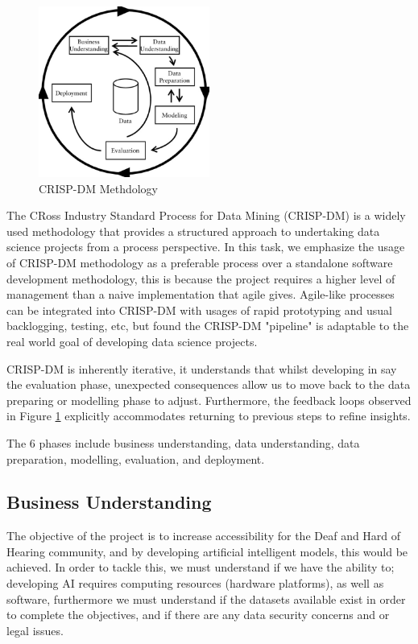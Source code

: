 \documentclass[preprint,11pt,review,authoryear]{elsarticle}
\begin{document}
\begin{figure}[h]
    \centering
    \includegraphics[width=0.5\textwidth]{images/CRISP-DM-process-model_W640.jpg}
    \caption{CRISP-DM Methdology \citep{lofstromUtilizingDiversityPerformance2009}}
    \label{fig:CRISP-DM}
\end{figure}

The CRoss Industry Standard Process for Data Mining (CRISP-DM) is a widely used methodology that provides a structured approach to undertaking data science projects from a process perspective. In this task, we emphasize the usage of CRISP-DM methodology as a preferable process over a standalone software development methodology, this is because the project requires a higher level of management than a naive implementation that agile gives. Agile-like processes can be integrated into CRISP-DM with usages of rapid prototyping and usual backlogging, testing, etc, but found the CRISP-DM "pipeline" is adaptable to the real world goal of developing data science projects.

CRISP-DM is inherently iterative, it understands that whilst developing in say the evaluation phase, unexpected consequences allow us to move back to the data preparing or modelling phase to adjust. Furthermore, the feedback loops observed in Figure \ref{fig:CRISP-DM} explicitly accommodates returning to previous steps to refine insights. 

The 6 phases include business understanding, data understanding, data preparation, modelling, evaluation, and deployment.

\subsection{Business Understanding}

The objective of the project is to increase accessibility for the Deaf and Hard of Hearing community, and by developing artificial intelligent models, this would be achieved. In order to tackle this, we must understand if we have the ability to; developing AI requires computing resources (hardware platforms), as well as software, furthermore we must understand if the datasets available exist in order to complete the objectives, and if there are any data security concerns and or legal issues.
\end{document}
